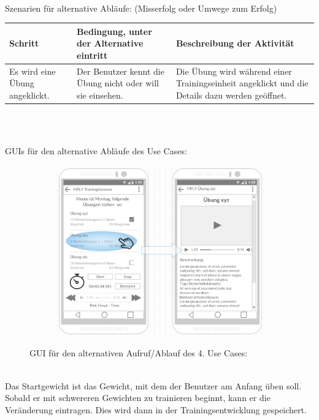 \documentclass[FIPLY_base.tex]{subfiles}
\begin{document}
	\ \\
	Szenarien für alternative Abläufe: (Misserfolg oder Umwege zum Erfolg)
	\ \\
	\begin{center}	
		\def\arraystretch{1.3}%
		\begin{tabular}{| p{4cm} | p{4cm} | p{4cm} |}
			\hline
			\textbf{Schritt} & \textbf{Bedingung, unter der Alternative eintritt} & \textbf{Beschreibung der Aktivität}  \\ \hline 
			Es wird eine Übung angeklickt. & Der Benutzer kennt die Übung nicht oder will sie einsehen. & Die Übung wird während einer Trainingseinheit angeklickt und die Details dazu werden geöffnet.\\ \hline
		\end{tabular} \\
	\end{center}
	\ \\
	GUIs für  den alternative Abläufe des Use Cases:
	\ \\
	\begin{figure}[H]
		\begin{subfigure}[b]{0.3\textwidth}
			\includegraphics[scale=0.32]{img/Trainingssessionalternativ}
		\end{subfigure}
		\caption{GUI für den alternativen Aufruf/Ablauf des 4. Use Cases:}
	\end{figure}
	\ \\
	Das Startgewicht ist das Gewicht, mit dem der Benutzer am Anfang üben soll. Sobald  er mit schwereren Gewichten zu trainieren beginnt, kann er die Veränderung eintragen. Dies wird dann in der Trainingsentwicklung gespeichert. 
	
\end{document}
